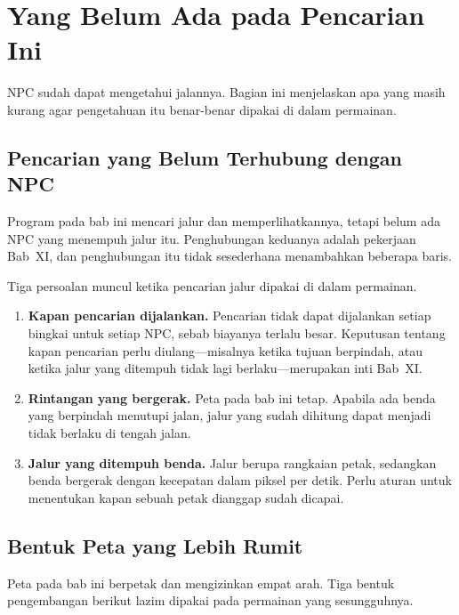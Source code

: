 \section{Yang Belum Ada pada Pencarian Ini}
\label{sec:belum-ada-astar}

NPC sudah dapat mengetahui jalannya. Bagian ini menjelaskan apa yang masih
kurang agar pengetahuan itu benar-benar dipakai di dalam permainan.

\subsection{Pencarian yang Belum Terhubung dengan NPC}

Program pada bab ini mencari jalur dan memperlihatkannya, tetapi belum ada NPC
yang menempuh jalur itu. Penghubungan keduanya adalah pekerjaan Bab~XI, dan
penghubungan itu tidak sesederhana menambahkan beberapa baris.

Tiga persoalan muncul ketika pencarian jalur dipakai di dalam permainan.

\begin{enumerate}
  \item \textbf{Kapan pencarian dijalankan.} Pencarian tidak dapat dijalankan
        setiap bingkai untuk setiap NPC, sebab biayanya terlalu besar.
        Keputusan tentang kapan pencarian perlu diulang---misalnya ketika
        tujuan berpindah, atau ketika jalur yang ditempuh tidak lagi
        berlaku---merupakan inti Bab~XI.
  \item \textbf{Rintangan yang bergerak.} Peta pada bab ini tetap. Apabila ada
        benda yang berpindah menutupi jalan, jalur yang sudah dihitung dapat
        menjadi tidak berlaku di tengah jalan.
  \item \textbf{Jalur yang ditempuh benda.} Jalur berupa rangkaian petak,
        sedangkan benda bergerak dengan kecepatan dalam piksel per detik.
        Perlu aturan untuk menentukan kapan sebuah petak dianggap sudah
        dicapai.
\end{enumerate}

\subsection{Bentuk Peta yang Lebih Rumit}

Peta pada bab ini berpetak dan mengizinkan empat arah. Tiga bentuk
pengembangan berikut lazim dipakai pada permainan yang sesungguhnya.

